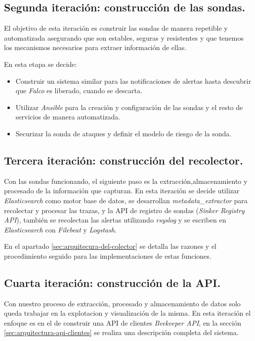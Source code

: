 \subsection{Segunda iteración: construcción de las sondas.}

El objetivo de esta iteración es construir las sondas de manera repetible y automatizada asegurando que son estables,
seguras y resistentes y que tenemos los mecanismos necesarios para extraer información de ellas.

En esta etapa se decide:

\begin{itemize}
    \item Construir un sistema similar para las notificaciones de alertas hasta descubrir que \emph{Falco} es liberado, cuando se descarta.
    \item Utilizar \emph{Ansible} para la creación y configuración de las sondas y el resto de servicios de manera automatizada.
    \item Securizar la sonda de ataques y definir el modelo de riesgo de la sonda.
\end{itemize}

\subsection{Tercera iteración: construcción del recolector.}

Con las sondas funcionando, el siguiente paso es la extracción,almacenamiento y procesado de la información que capturan. En esta iteración
se decide utilizar \emph{Elasticsearch} como motor base de datos, se desarrollan \emph{metadata\_extractor} para recolectar y procesar las trazas, y 
la API de registro de sondas (\emph{Sinker Registry API}), también se recolectan las alertas utilizando \emph{rsyslog} y se escriben en \emph{Elasticsearch}
con \emph{Filebeat} y \emph{Logstash}.

En el apartado \ref{sec:arquitecura-del-colector} se detalla las razones y el procedimiento seguido para las implementaciones de estas funciones.

\subsection{Cuarta iteración: construcción de la API.}

Con nuestro proceso de extracción, procesado y almacenamiento de datos solo queda trabajar en la explotacion y visualización de la misma. En esta iteración
el enfoque es en el de construir una API de clientes \emph{Beekeeper API}, en la sección \ref{sec:arquitectura-api-clientes} se realiza
una descripción completa del sistema.

